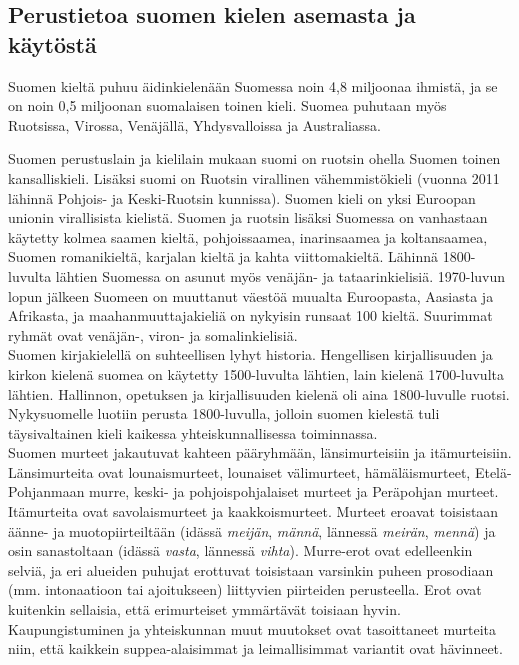 \begin{multicols}{2}
\subsection{Perustietoa suomen kielen asemasta ja käytöstä}



Suomen kieltä puhuu äidinkielenään Suomessa noin 4,8 miljoonaa ihmistä, ja
se on noin 0,5 miljoonan suomalaisen toinen kieli. Suomea puhutaan myös
Ruotsissa, Virossa, Venäjällä, Yhdysvalloissa ja Australiassa.

Suomen perustuslain ja kielilain mukaan suomi on ruotsin ohella Suomen toinen
kansalliskieli. Lisäksi suomi on Ruotsin virallinen vähemmistökieli (vuonna 
2011 lähinnä Pohjois- ja Keski-Ruotsin kunnissa). Suomen kieli on yksi 
Euroopan unionin virallisista kielistä. Suomen ja ruotsin lisäksi
Suomessa on vanhastaan käytetty kolmea saamen kieltä, pohjoissaamea,
inarinsaamea ja koltansaamea, Suomen romanikieltä, karjalan kieltä ja kahta
viittomakieltä. Lähinnä 1800-luvulta lähtien Suomessa on asunut myös venäjän-
ja tataarinkielisiä. 1970-luvun lopun jälkeen Suomeen on muuttanut väestöä
muualta Euroopasta, Aasiasta ja Afrikasta, ja maahanmuuttajakieliä on nykyisin
runsaat 100 kieltä. Suurimmat ryhmät ovat venäjän-, viron- ja somalinkielisiä.\\
Suomen kirjakielellä on suhteellisen lyhyt historia. Hengellisen kirjallisuuden
ja kirkon kielenä suomea on käytetty 1500-luvulta lähtien, lain kielenä
1700-luvulta lähtien. Hallinnon, opetuksen ja kirjallisuuden kielenä oli aina
1800-luvulle ruotsi. Nykysuomelle luotiin perusta 1800-luvulla, jolloin suomen
kielestä tuli täysivaltainen kieli kaikessa yhteiskunnallisessa toiminnassa.\\
Suomen murteet jakautuvat kahteen pääryhmään, länsimurteisiin ja itämurteisiin.
Länsimurteita ovat lounaismurteet, lounaiset välimurteet, hämäläismurteet,
Etelä-Pohjanmaan murre, keski- ja pohjoispohjalaiset murteet ja Peräpohjan
murteet. Itämurteita ovat savolaismurteet ja kaakkoismurteet. Murteet eroavat
toisistaan äänne- ja muotopiirteiltään (idässä \textit{meijän}, \textit{männä}, lännessä \textit{meirän},
\textit{mennä}) ja osin sanastoltaan (idässä \textit{vasta}, lännessä \textit{vihta}). Murre-erot ovat
edelleenkin selviä, ja eri alueiden puhujat
erottuvat toisistaan varsinkin puheen prosodiaan (mm. intonaatioon tai
ajoitukseen) liittyvien piirteiden perusteella. Erot ovat kuitenkin sellaisia,
että erimurteiset ymmärtävät toisiaan hyvin. Kaupungistuminen ja yhteiskunnan
muut muutokset ovat tasoittaneet murteita niin, että kaikkein suppea-alaisimmat
ja leimallisimmat variantit ovat hävinneet.



\end{multicols}

